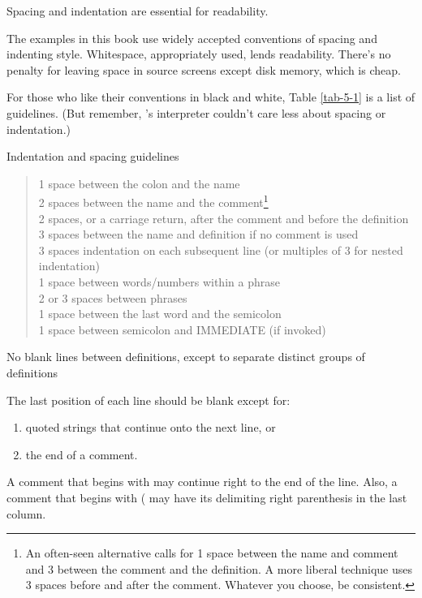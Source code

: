 \begin{tip}
Spacing and indentation are essential for readability.
\end{tip}
The examples in this book use widely accepted conventions of spacing
and indenting style.  Whitespace, appropriately used, lends readability.
There's no penalty for leaving space in source screens except disk
memory, which is cheap.

For those who like their conventions in black and white, Table \ref{tab-5-1} is
a list of guidelines.  (But remember, \Forth{}'s interpreter couldn't care
less about spacing or indentation.)

\begin{table}[bbbb]
\caption{Indentation and spacing guidelines}
\label{tab-5-1}
\medskip\blackline{0pt}\medskip
\begin{minipage}{\textwidth}
\begin{quote}
1 space between the colon and the name\\
2 spaces between the name and the comment\footnote{An often-seen
alternative calls for 1 space between the name and comment and 3
between the comment and the definition.  A more liberal technique uses
3 spaces before and after the comment.  Whatever you choose, be
consistent.}\\
2 spaces, or a carriage return, after the comment and before the definition\footnotemark[1]\\
3 spaces between the name and definition if no comment is used\\
3 spaces indentation on each subsequent line (or multiples of 3 for nested
indentation)\\
1 space between words/numbers within a phrase\\
2 or 3 spaces between phrases\\
1 space between the last word and the semicolon\\
1 space between semicolon and IMMEDIATE (if invoked)
\end{quote}
No blank lines between definitions, except to separate distinct groups of
definitions

\end{minipage}
\medskip\blackline{0pt}
\end{table}


The last position of each line should be blank except for:
\begin{enumerate}
\item quoted strings that continue onto the next line, or
\item the end of a comment.
\end{enumerate}
A comment that begins with \forth{\bs} may continue right to the end of the line.
Also, a comment that begins with ( may have its delimiting right parenthesis
in the last column.

